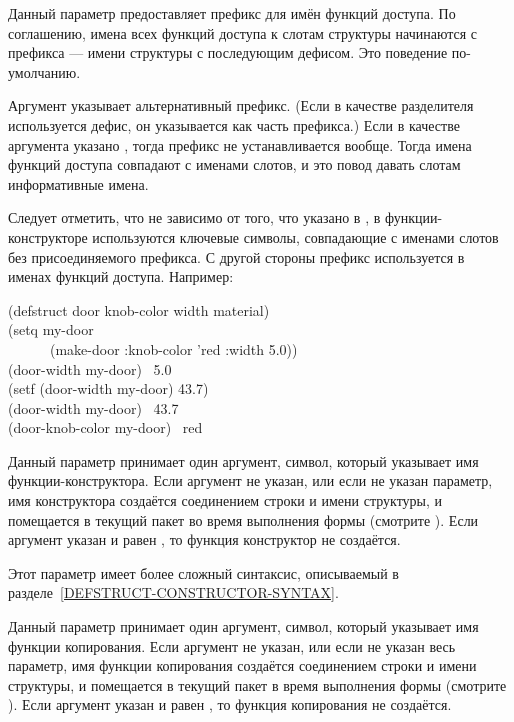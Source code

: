 \begin{flushdesc}
\item[\cd{:conc-name}] Данный параметр предоставляет префикс для имён функций
  доступа.  По соглашению, имена всех функций доступа к слотам структуры
  начинаются с префикса --- имени структуры с последующим дефисом. Это поведение
  по-умолчанию.

  Аргумент  указывает альтернативный префикс. (Если в качестве
  разделителя используется дефис, он указывается как часть префикса.)  Если в
  качестве аргумента указано {\false}, тогда префикс не устанавливается вообще.
  Тогда имена функций доступа совпадают с именами слотов, и это повод давать
  слотам информативные имена.

  Следует отметить, что не зависимо от того, что указано в , в
  функции-конструкторе используются ключевые символы, совпадающие с именами
  слотов без присоединяемого префикса.  С другой стороны префикс используется в
  именах функций доступа. Например:
  \begin{lisp}
    (defstruct door knob-color width material) \\
    (setq my-door \\
    ~~~~~~(make-door :knob-color 'red :width 5.0)) \\
    (door-width my-door) \EV\ 5.0 \\
    (setf (door-width my-door) 43.7) \\
    (door-width my-door) \EV\ 43.7 \\
    (door-knob-color my-door) \EV\ red
  \end{lisp}

\item[\cd{:constructor}] Данный параметр принимает один аргумент, символ,
  который указывает имя функции-конструктора. Если аргумент не указан, или если
  не указан параметр, имя конструктора создаётся соединением строки 
  и имени структуры, и помещается в текущий пакет во время выполнения формы
   (смотрите ).  Если аргумент указан и равен
  {\false}, то функция конструктор не создаётся.

Этот параметр имеет более сложный синтаксис, описываемый в
разделе~\ref{DEFSTRUCT-CONSTRUCTOR-SYNTAX}.

\item[\cd{:copier}] Данный параметр принимает один аргумент, символ, который
  указывает имя функции копирования. Если аргумент не указан, или если не указан
  весь параметр, имя функции копирования создаётся соединением строки
   и имени структуры, и помещается в текущий пакет в время
  выполнения формы  (смотрите ).  Если аргумент
  указан и равен {\false}, то функция копирования не создаётся.


\end{flushdesc}
